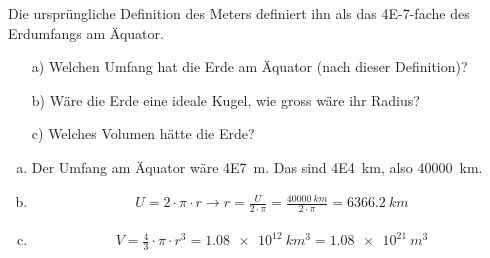
\begin{aufgabe}
	Die ursprüngliche Definition des Meters definiert ihn als das \num{4E-7}-fache des Erdumfangs am Äquator.
	\begin{itemize}
		\item [a)] Welchen Umfang hat die Erde am Äquator (nach dieser Definition)?
		\item [b)] Wäre die Erde eine ideale Kugel, wie gross wäre ihr Radius?
		\item [c)] Welches Volumen hätte die Erde?
	\end{itemize}
	\begin{loesung}
		\begin{enumerate} [a)]
			\item Der Umfang am Äquator wäre \SI{4E7}{m}. Das sind \SI{4E4}{km}, also \SI{40000}{km}.
			\item
				\begin{eqnarray*}
					U=2\cdot\pi\cdot r \to r=\frac{U}{2\cdot\pi}=\frac{\SI{40000}{km}}{2\cdot\pi}=\SI{6366.2}{km}
				\end{eqnarray*}
			\item
				\begin{eqnarray*}
					V=\frac{4}{3}\cdot\pi\cdot r^3=\SI{1.08e+12}{km^3}=\SI{1.08e+21}{m^3}
				\end{eqnarray*}
		\end{enumerate}
	\end{loesung}
\end{aufgabe}
